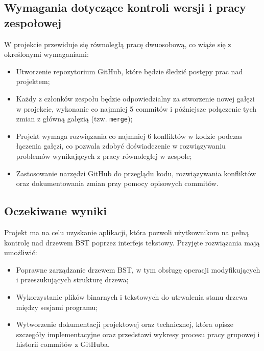 \subsection{Wymagania dotyczące kontroli wersji i pracy zespołowej}

W projekcie przewiduje się równoległą pracę dwuosobową, co wiąże się z określonymi wymaganiami:
\begin{itemize}
  \item Utworzenie repozytorium GitHub, które będzie śledzić postępy prac nad projektem;
  \item Każdy z członków zespołu będzie odpowiedzialny za stworzenie nowej gałęzi w projekcie, wykonanie co najmniej 5 commitów i późniejsze połączenie tych zmian z główną gałęzią (tzw. \texttt{merge});
  \item Projekt wymaga rozwiązania co najmniej 6 konfliktów w kodzie podczas łączenia gałęzi, co pozwala zdobyć doświadczenie w rozwiązywaniu problemów wynikających z pracy równoległej w zespole;
  \item Zastosowanie narzędzi GitHub do przeglądu kodu, rozwiązywania konfliktów oraz dokumentowania zmian przy pomocy opisowych commitów.
\end{itemize}

\subsection{Oczekiwane wyniki}

Projekt ma na celu uzyskanie aplikacji, która pozwoli użytkownikom na pełną kontrolę nad drzewem BST poprzez interfejs tekstowy. Przyjęte rozwiązania mają umożliwić:
\begin{itemize}
  \item Poprawne zarządzanie drzewem BST, w tym obsługę operacji modyfikujących i przeszukujących strukturę drzewa;
  \item Wykorzystanie plików binarnych i tekstowych do utrwalenia stanu drzewa między sesjami programu;
  \item Wytworzenie dokumentacji projektowej oraz technicznej, która opisze szczegóły implementacyjne oraz przedstawi wykresy procesu pracy grupowej i historii commitów z GitHuba.
\end{itemize}
